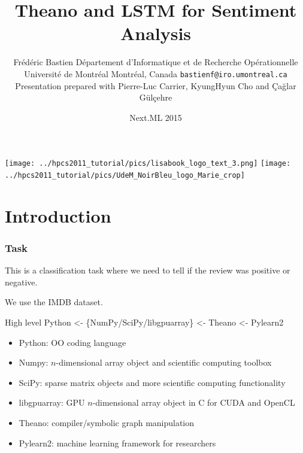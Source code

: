 \documentclass[utf8x,xcolor=pdftex,dvipsnames,table]{beamer}
\title{Theano and LSTM for Sentiment Analysis}
\author{%
\footnotesize
Frédéric Bastien \newline
Département d'Informatique et de Recherche Opérationnelle \newline
Université de Montréal \newline
Montréal, Canada \newline
\texttt{bastienf@iro.umontreal.ca} \newline \newline
Presentation prepared with Pierre-Luc Carrier, KyungHyun Cho and \newline
 Çağlar Gülçehre
}
\date{Next.ML 2015}
\begin{document}
\begin{frame}[plain]
 \titlepage
 \vspace{-5em}
 \texttt{[image: ../hpcs2011\_tutorial/pics/lisabook\_logo\_text\_3.png]}
 \hfill
 \texttt{[image: ../hpcs2011\_tutorial/pics/UdeM\_NoirBleu\_logo\_Marie\_crop]}
\end{frame}

\section{Introduction}
\begin{frame}
  \frametitle{Task}

This is a classification task where we need to tell if the review was
positive or negative.

We use the IMDB dataset.
\end{frame}

\begin{frame}
  \tableofcontents[currentsection]
\end{frame}


\begin{frame}{High level}\setcounter{page}{1}
  Python <- \{NumPy/SciPy/libgpuarray\} <- Theano <- Pylearn2
  \begin{itemize}
  \item Python: OO coding language
  \item Numpy: $n$-dimensional array object and scientific computing toolbox
  \item SciPy: sparse matrix objects and more scientific computing functionality
  \item libgpuarray: GPU $n$-dimensional array object in C for CUDA and OpenCL
  \item Theano: compiler/symbolic graph manipulation
  \item Pylearn2: machine learning framework for researchers
  \end{itemize}
\end{frame}

\end{document}
